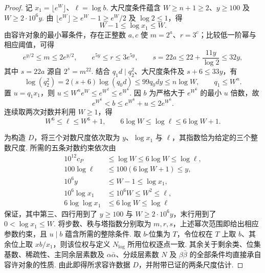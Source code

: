 \begin{proof}
记 $x_1=\lfloor e^W\rfloor$、$\ell=\log b$. 大尺度条件蕴含 $W\ge n+1\ge2$、$y\ge100$ 及 $W\ge2\cdot10^6y$. 由 $\lfloor e^W\rfloor\ge e^W-1\ge e^W/2$ 及 $\log 2\le1$，得
\[
 W-1\le\log x_1\le W .
\]
由容许对象的最小幂条件，存在正整数 $a,c$ 使 $m=2^a$、$r=3^c$；比较低一阶幂与相应阈值，可得
\[
 e^{y/2}\le m\le2e^{y/2},\qquad
 e^{5y}\le r\le3e^{5y},\qquad
 s=22a\le22+\frac{11y}{\log2}\le32y ,
\]
其中 $s=22a$ 源自 $2^s=m^{22}$. 结合 $q_1d\mid q_2^2$、大尺度条件及 $s+6\le33y$，有
\[
 \log(q_2^2)=2(s+6)\log(q_0d)\le99q_0dy\le n\log W,\qquad
 q_1\le W^n.
\]
置 $u=q_1x_1$，则 $u\le W^ne^W\le e^{W^2}\le e^{W^6}$. 因 $b$ 为严格大于 $e^{W^6}$ 的最小 $u$ 倍数，故
\[
 e^{W^6}<b\le e^{W^6}+u\le2e^{W^6}.
\]
连续取两次对数并利用 $W\ge1$，得
\[
 W^6\le \ell\le W^6+1,\qquad
 6\log W\le\log \ell\le 6\log W+1 .
\]

为构造 $D$，将三个对数尺度依次取为 $y$、$\log x_1$ 与 $\ell$，其指数恰为给定的三个整数尺度. 所需的五条对数约束依次由
\[
\begin{aligned}
 10^{12}c_P &\le \log W\le 6\log W\le\log \ell,\\
 100\log \ell &\le100(6\log W+1)\le y,\\
 10^6y &\le W-1\le\log x_1,\\
 10^6\log x_1 &\le10^6W\le W^2\le \ell,\\
 6\log\log x_1 &\le 6\log W\le\log \ell
\end{aligned}
\]
保证，其中第三、四行用到了 $y\ge100$ 与 $W\ge2\cdot10^6y$，末行用到了 $0<\log x_1\le W$.
将步数、秩与塔指数分别取为 $m,r,s$，上述幂次范围即给出相应参数约束，且 $u\mid b$ 蕴含所需的整除条件. 取 $b$-位集为 $T$，令位权在 $T$ 上取 $b$、其余位上取 $xb/x_1$，则该位权与定义 $N_{\log}$ 所用位权逐点一致. 其余关于剩余类、位集基数、稀疏性、主同余层素数及 $\alpha\bar\alpha$、分歧层素数 $N$ 及 $\beta\bar\beta$ 的全部条件均直接承自容许对象的性质. 由此即得所求容许数据 $D$，并附带已证的两条尺度估计.
\end{proof}

